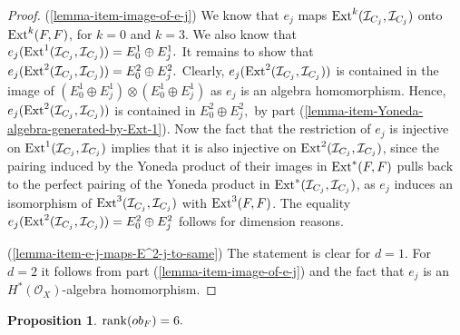 \documentclass[12pt]{amsart}
\numberwithin{equation}{subsection}
\theoremstyle{plain}
\newtheorem{prop}[thm]{Proposition}
\theoremstyle{definition}
\newcommand{\StructureSheaf}[1]{{\mathcal O}_{#1}}
\newcommand{\rank}{{\rm rank}}
\newcommand{\Ext}{{\rm Ext}}
\newcommand{\Ideal}[1]{{\mathcal I}_{#1}}
\begin{document}
\begin{proof}
(\ref{lemma-item-image-of-e-j}) We know that $e_j$ maps $\Ext^k(\Ideal{C_j},\Ideal{C_j})$  onto $\Ext^k(F,F)$, for $k=0$ and $k=3$. We also know that $e_j(\Ext^1(\Ideal{C_j},\Ideal{C_j}))=E^1_0\oplus E^1_j.$
It remains to show that $e_j(\Ext^2(\Ideal{C_j},\Ideal{C_j}))=E^2_0\oplus E^2_j.$ Clearly, $e_j(\Ext^2(\Ideal{C_j},\Ideal{C_j}))$
is contained in the image of $(E^1_0\oplus E^1_j)\otimes (E^1_0\oplus E^1_j)$ as $e_j$ is an algebra homomorphism. Hence,
$e_j(\Ext^2(\Ideal{C_j},\Ideal{C_j}))$ is contained in $E^2_0\oplus E^2_j,$ by part (\ref{lemma-item-Yoneda-algebra-generated-by-Ext-1}). Now the fact that the restriction of $e_j$ is injective on $\Ext^1(\Ideal{C_j},\Ideal{C_j})$ implies that it is also injective on $\Ext^2(\Ideal{C_j},\Ideal{C_j})$,
since the pairing induced by the Yoneda product of their images in $\Ext^*(F,F)$ pulls back to the perfect pairing of the Yoneda product in $\Ext^*(\Ideal{C_j},\Ideal{C_j})$, as $e_j$ induces an isomorphism of $\Ext^3(\Ideal{C_j},\Ideal{C_j})$ with 
$\Ext^3(F,F)$. The equality $e_j(\Ext^2(\Ideal{C_j},\Ideal{C_j}))=E^2_0\oplus E^2_j$ follows for dimension reasons.

(\ref{lemma-item-e-j-maps-E^2-j-to-same}) The statement is clear for $d=1$. For $d=2$ it follows from part (\ref{lemma-item-image-of-e-j}) and the fact that $e_j$ is an $H^*(\StructureSheaf{X})$-algebra homomorphism.
\end{proof}

\begin{prop}
\label{prop-obstruction-map-has-rank-6}
$\rank(ob_F)=6.$
\end{prop}
\end{document}
